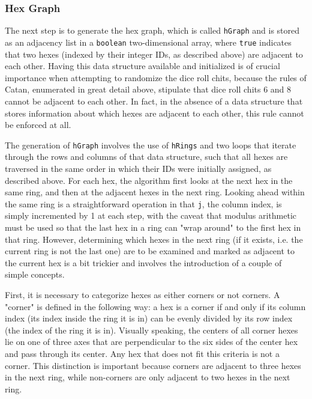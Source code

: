\documentclass[pageno]{jpaper}
\begin{document}
\begin{doublespacing}
\hypertarget{sec:hex_graph}{}
\subsubsection{Hex Graph}

The next step is to generate the hex graph, which is called \lstinline$hGraph$ and is stored as an adjacency list in a \lstinline$boolean$ two-dimensional array, where \lstinline$true$ indicates that two hexes (indexed by their integer IDs, as described above) are adjacent to each other. Having this data structure available and initialized is of crucial importance when attempting to randomize the dice roll chits, because the rules of Catan, enumerated in great detail above, stipulate that dice roll chits 6 and 8 cannot be adjacent to each other. In fact, in the absence of a data structure that stores information about which hexes are adjacent to each other, this rule cannot be enforced at all.

The generation of \lstinline$hGraph$ involves the use of \lstinline$hRings$ and two loops that iterate through the rows and columns of that data structure, such that all hexes are traversed in the same order in which their IDs were initially assigned, as described above. For each hex, the algorithm first looks at the next hex in the same ring, and then at the adjacent hexes in the next ring. Looking ahead within the same ring is a straightforward operation in that \lstinline$j$, the column index, is simply incremented by 1 at each step, with the caveat that modulus arithmetic must be used so that the last hex in a ring can "wrap around" to the first hex in that ring. However, determining which hexes in the next ring (if it exists, i.e. the current ring is not the last one) are to be examined and marked as adjacent to the current hex is a bit trickier and involves the introduction of a couple of simple concepts.

First, it is necessary to categorize hexes as either corners or not corners. A "corner" is defined in the following way: a hex is a corner if and only if its column index (its index inside the ring it is in) can be evenly divided by its row index (the index of the ring it is in). Visually speaking, the centers of all corner hexes lie on one of three axes that are perpendicular to the six sides of the center hex and pass through its center. Any hex that does not fit this criteria is not a corner. This distinction is important because corners are adjacent to three hexes in the next ring, while non-corners are only adjacent to two hexes in the next ring.


\end{doublespacing}
\end{document}
